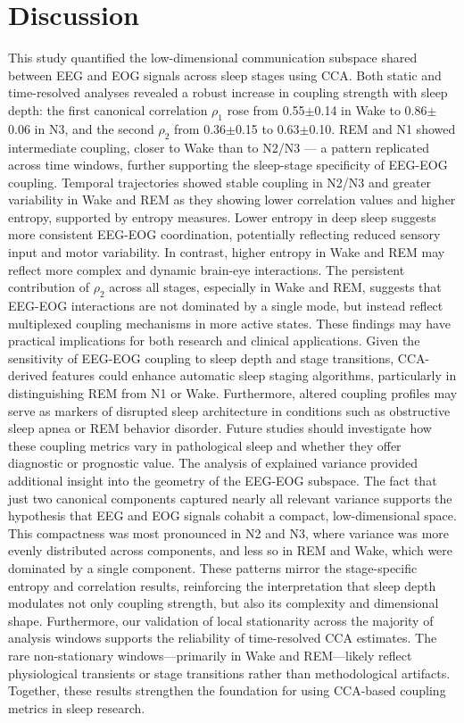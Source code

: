 \section{Discussion}

This study quantified the low-dimensional communication subspace shared between EEG and EOG signals across sleep stages using CCA. Both static and time-resolved analyses revealed a robust increase in coupling strength with sleep depth: the first canonical correlation $\rho_1$ rose from 0.55$\pm$0.14 in Wake to 0.86$\pm$0.06 in N3, and the second $\rho_2$ from 0.36$\pm$0.15 to 0.63$\pm$0.10. REM and N1 showed intermediate coupling, closer to Wake than to N2/N3 --- a pattern replicated across time windows, further supporting the sleep-stage specificity of EEG-EOG coupling.
Temporal trajectories showed stable coupling in N2/N3 and greater variability in Wake and REM as they showing lower correlation values and higher entropy, supported by entropy measures. Lower entropy in deep sleep suggests more consistent EEG-EOG coordination, potentially reflecting reduced sensory input and motor variability. In contrast, higher entropy in Wake and REM may reflect more complex and dynamic brain-eye interactions. The persistent contribution of $\rho_2$ across all stages, especially in Wake and REM, suggests that EEG-EOG interactions are not dominated by a single mode, but instead reflect multiplexed coupling mechanisms in more active states. These findings may have practical implications for both research and clinical applications. Given the sensitivity of EEG-EOG coupling to sleep depth and stage transitions, CCA-derived features could enhance automatic sleep staging algorithms, particularly in distinguishing REM from N1 or Wake. Furthermore, altered coupling profiles may serve as markers of disrupted sleep architecture in conditions such as obstructive sleep apnea or REM behavior disorder. Future studies should investigate how these coupling metrics vary in pathological sleep and whether they offer diagnostic or prognostic value.
The analysis of explained variance provided additional insight into the geometry of the EEG-EOG subspace. The fact that just two canonical components captured nearly all relevant variance supports the hypothesis that EEG and EOG signals cohabit a compact, low-dimensional space. This compactness was most pronounced in N2 and N3, where variance was more evenly distributed across components, and less so in REM and Wake, which were dominated by a single component. These patterns mirror the stage-specific entropy and correlation results, reinforcing the interpretation that sleep depth modulates not only coupling strength, but also its complexity and dimensional shape.
Furthermore, our validation of local stationarity across the majority of analysis windows supports the reliability of time-resolved CCA estimates. The rare non-stationary windows—primarily in Wake and REM—likely reflect physiological transients or stage transitions rather than methodological artifacts. Together, these results strengthen the foundation for using CCA-based coupling metrics in sleep research.

